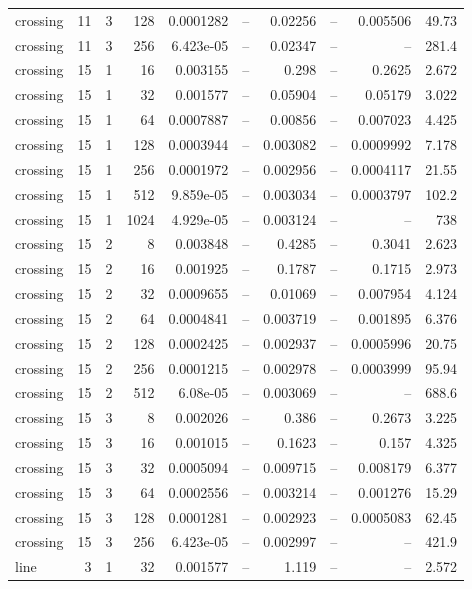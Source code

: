 \begin{tabular}{lrrrrrrrrr}
crossing & 11 & 3 & 128 & 0.0001282 & -- & 0.02256 & -- & 0.005506 & 49.73 \\
crossing & 11 & 3 & 256 & 6.423e-05 & -- & 0.02347 & -- & -- & 281.4 \\
crossing & 15 & 1 & 16 & 0.003155 & -- & 0.298 & -- & 0.2625 & 2.672 \\
crossing & 15 & 1 & 32 & 0.001577 & -- & 0.05904 & -- & 0.05179 & 3.022 \\
crossing & 15 & 1 & 64 & 0.0007887 & -- & 0.00856 & -- & 0.007023 & 4.425 \\
crossing & 15 & 1 & 128 & 0.0003944 & -- & 0.003082 & -- & 0.0009992 & 7.178 \\
crossing & 15 & 1 & 256 & 0.0001972 & -- & 0.002956 & -- & 0.0004117 & 21.55 \\
crossing & 15 & 1 & 512 & 9.859e-05 & -- & 0.003034 & -- & 0.0003797 & 102.2 \\
crossing & 15 & 1 & 1024 & 4.929e-05 & -- & 0.003124 & -- & -- & 738 \\
crossing & 15 & 2 & 8 & 0.003848 & -- & 0.4285 & -- & 0.3041 & 2.623 \\
crossing & 15 & 2 & 16 & 0.001925 & -- & 0.1787 & -- & 0.1715 & 2.973 \\
crossing & 15 & 2 & 32 & 0.0009655 & -- & 0.01069 & -- & 0.007954 & 4.124 \\
crossing & 15 & 2 & 64 & 0.0004841 & -- & 0.003719 & -- & 0.001895 & 6.376 \\
crossing & 15 & 2 & 128 & 0.0002425 & -- & 0.002937 & -- & 0.0005996 & 20.75 \\
crossing & 15 & 2 & 256 & 0.0001215 & -- & 0.002978 & -- & 0.0003999 & 95.94 \\
crossing & 15 & 2 & 512 & 6.08e-05 & -- & 0.003069 & -- & -- & 688.6 \\
crossing & 15 & 3 & 8 & 0.002026 & -- & 0.386 & -- & 0.2673 & 3.225 \\
crossing & 15 & 3 & 16 & 0.001015 & -- & 0.1623 & -- & 0.157 & 4.325 \\
crossing & 15 & 3 & 32 & 0.0005094 & -- & 0.009715 & -- & 0.008179 & 6.377 \\
crossing & 15 & 3 & 64 & 0.0002556 & -- & 0.003214 & -- & 0.001276 & 15.29 \\
crossing & 15 & 3 & 128 & 0.0001281 & -- & 0.002923 & -- & 0.0005083 & 62.45 \\
crossing & 15 & 3 & 256 & 6.423e-05 & -- & 0.002997 & -- & -- & 421.9 \\
line & 3 & 1 & 32 & 0.001577 & -- & 1.119 & -- & -- & 2.572 \\

\end{tabular}
